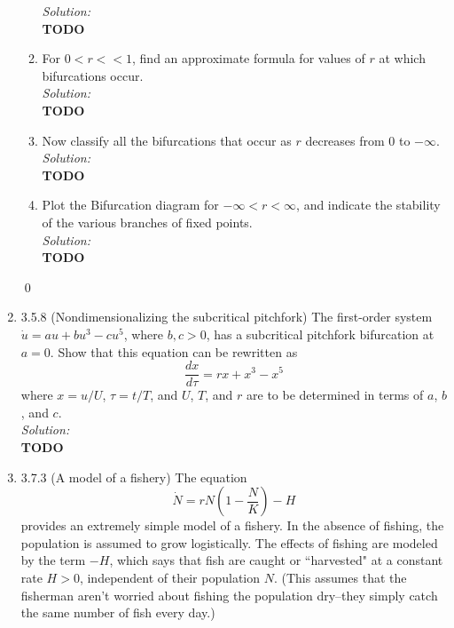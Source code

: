 \documentclass[10pt]{amsart}
\theoremstyle{nonumberplain}
\begin{document}
\begin{enumerate}[label={\bf {\arabic*}:}]
\begin{enumerate}
\noindent
\textit{Solution:} \\
\textbf{TODO} \\

\item For $0 < r << 1$, find an approximate formula for values of $r$ at which bifurcations occur. \\

\noindent
\textit{Solution:} \\
\textbf{TODO} \\

\item Now classify all the bifurcations that occur as $r$ decreases from 0 to $-\infty$. \\

\noindent
\textit{Solution:} \\
\textbf{TODO} \\

\item Plot the Bifurcation diagram for $-\infty < r < \infty$, and indicate the stability of the various branches of fixed points. \\

\noindent
\textit{Solution:} \\
\textbf{TODO} \\

\end{enumerate}

\qed \\

\newpage

\item 3.5.8 (Nondimensionalizing the subcritical pitchfork) The first-order system $\dot u = au + bu^3 - c u^5$, where $b, c > 0$, has a subcritical pitchfork bifurcation at $a = 0$.
Show that this equation can be rewritten as
$$\frac {dx}{d\tau} = r x + x^3 - x^5$$
where $x = u/U$, $\tau = t/T$, and $U$, $T$, and $r$ are to be determined in terms of $a$, $b$, and $c$. \\

\noindent
\textit{Solution:} \\
\textbf{TODO} \\

\newpage

\item 3.7.3 (A model of a fishery) The equation
$$\dot N = rN\left( 1 - \frac N K \right) - H$$
provides an extremely simple model of a fishery.
In the absence of fishing, the population is assumed to grow logistically. 
The effects of fishing are modeled by the term $-H$, which says that fish are caught or ``harvested" at a constant rate $H > 0$, independent of their population $N$.
(This assumes that the fisherman aren't worried about fishing the population dry--they simply catch the same number of fish every day.) \\


\end{enumerate}
\end{document}
